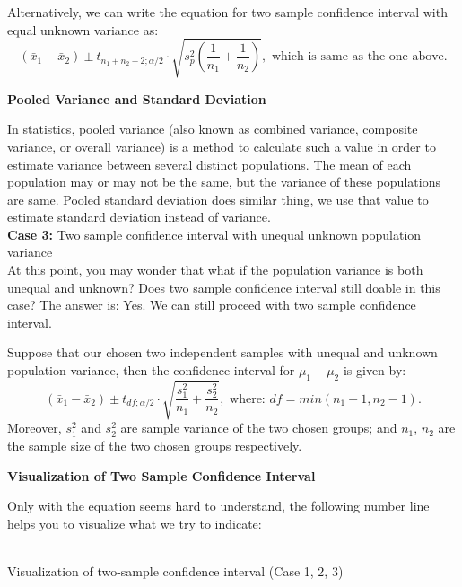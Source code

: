Alternatively, we can write the equation for two sample confidence interval with equal unknown variance as: $$(\bar{x}_1 - \bar{x}_2)  \pm  t_{n_1+n_2-2; \alpha/2} \cdot \sqrt{s_p^2(\frac{1}{n_1} + \frac{1}{n_2})}, \text{ which is same as the one above.}$$

\textbf{Pooled Variance and Standard Deviation}

In statistics, pooled variance (also known as combined variance, composite variance, or overall variance) is a method to calculate such a value in order to estimate variance between several distinct populations. The mean of each population may or may not be the same, but the variance of these populations are same. Pooled standard deviation does similar thing, we use that value to estimate standard deviation instead of variance.\\

\textbf{Case 3:} Two sample confidence interval with unequal unknown population variance\\

At this point, you may wonder that what if the population variance is both unequal and unknown? Does two sample confidence interval still doable in this case? The answer is: Yes. We can still proceed with two sample confidence interval.

\begin{definition}
Suppose that our chosen two independent samples with unequal and unknown population variance, then the confidence interval for $\mu_1 - \mu_2$ is given by: $$(\bar{x}_1 - \bar{x}_2)  \pm t_{df; \alpha/2} \cdot \sqrt{\frac{s_1^2}{n_1} + \frac{s_2^2}{n_2}}, \text{ where: $df = min(n_1-1, n_2-1)$.}$$
Moreover, $s_1^2$ and $s_2^2$ are sample variance of the two chosen groups; and $n_1$, $n_2$ are the sample size of the two chosen groups respectively.
\end{definition}

\textbf{Visualization of Two Sample Confidence Interval}

Only with the equation seems hard to understand, the following number line helps you to visualize what we try to indicate:
\begin{center}
\vspace{0.5em}
\small\textbf{}\\Visualization of two-sample confidence interval (Case 1, 2, 3)
\end{center}

